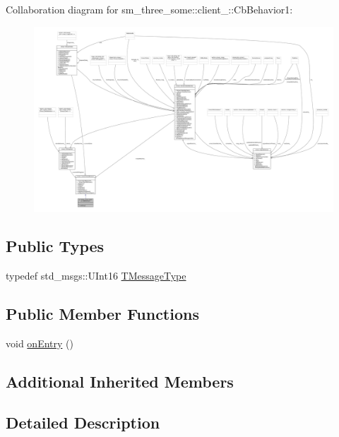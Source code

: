 Collaboration diagram for sm\+\_\+three\+\_\+some\+:\+:client\+\_\+:\+:Cb\+Behavior1\+:
\nopagebreak
\begin{figure}[H]
\begin{center}
\leavevmode
\includegraphics[width=350pt]{classsm__three__some_1_1client__1_1_1CbBehavior1__coll__graph}
\end{center}
\end{figure}
\subsection*{Public Types}
\begin{DoxyCompactItemize}
\item 
typedef std\+\_\+msgs\+::\+U\+Int16 \hyperlink{classsm__three__some_1_1client__1_1_1CbBehavior1_a1f7869a9abb07531d0f0d1c37e44827d}{T\+Message\+Type}
\end{DoxyCompactItemize}
\subsection*{Public Member Functions}
\begin{DoxyCompactItemize}
\item 
void \hyperlink{classsm__three__some_1_1client__1_1_1CbBehavior1_a341d0257beb10475e7e5f69b26260ac5}{on\+Entry} ()
\end{DoxyCompactItemize}
\subsection*{Additional Inherited Members}


\subsection{Detailed Description}


